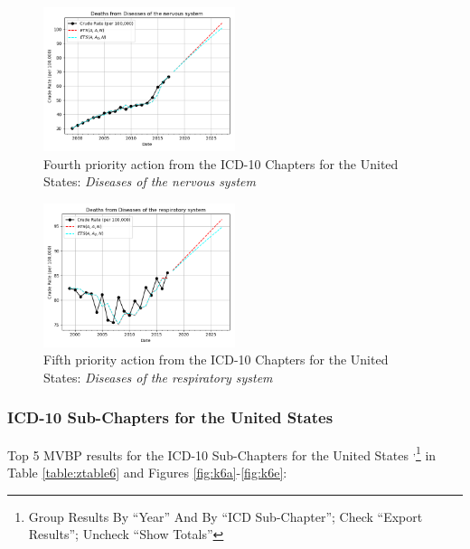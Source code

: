 \documentclass[10pt, a4paper, twocolumn]{IEEEconf}
\begin{document}
\begin{figure}[H]
  \centering
  \includegraphics[width=0.5\textwidth]{results/US_ICD10_CHAPTERS/Diseases_of_the_nervous_system_ets.png}
  \caption{Fourth priority action from the ICD-10 Chapters for the United States: \textit{Diseases of the nervous system}}\label{fig:k5d}
\end{figure}

\begin{figure}[H]
  \centering
  \includegraphics[width=0.5\textwidth]{results/US_ICD10_CHAPTERS/Diseases_of_the_respiratory_system_ets.png}
  \caption{Fifth priority action from the ICD-10 Chapters for the United States: \textit{Diseases of the respiratory system}}\label{fig:k5e}
\end{figure}

\clearpage

\subsubsection{ICD-10 Sub-Chapters for the United States}

Top 5 MVBP results for the ICD-10 Sub-Chapters for the United States \citep{centers2017underlying}\textsuperscript{,}\footnote{Group Results By \enquote{Year} And By \enquote{ICD Sub-Chapter}; Check \enquote{Export Results}; Uncheck \enquote{Show Totals}} in Table \ref{table:ztable6} and Figures \ref{fig:k6a}-\ref{fig:k6e}:
\end{document}
